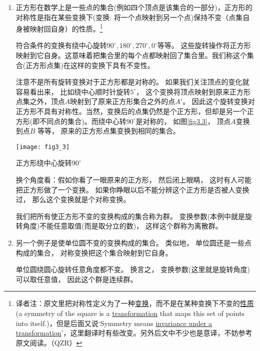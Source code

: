 \begin{enumerate}
	\item 正方形在数学上是一些点的集合(例如四个顶点是该集合的一部分)，正方形的对称性是指在某些变换下(变换: 将一个点映射到另一个点)保持不变（点集自身被映射回自身）的性质。\footnote{译者注：原文里把对称性定义为了一种\underline{变换}，而不是在某种变换下不变的\underline{性质}(a symmetry of the square is a \underline{transformation} that maps this set of points into itself.)，但是后面又说`Symmetry means \underline{invariance under a transformation}'，这里翻译时有些改变。另外后文中不少也是意译，不妨参考原文阅读。（QZR）}

	符合条件的变换有绕中心旋转$90^\circ, 180^\circ, 270^\circ, 0^\circ$等等。 这些旋转操作将正方形映射到它自身。这意味着把集合里的每个点都映射回了集合里。我们称这个集合(正方形点集)在这样的变换下具有不变性。



	注意不是所有旋转变换对于正方形都是对称的。 如果我们关注顶点的变化就容易看出来， 比如绕中心顺时针旋转$5^\circ$， 这个变换将顶点映射到原来正方形点集之外，顶点$A$映射到了原来正方形集合之外的点$A'$。 因此这个旋转变换对正方形不具有对称性。当然，变换后的点集仍然是个正方形，但却是另一个正方形(即不同点的集合)。而绕中心转$90^\circ$是对称的， 如图\ref{fig3.3}， 顶点$A$变换到点$B$ 等等， 原来的正方形点集变换到相同的集合。

	{
	\centering
	\captionsetup{type=figure}
	\texttt{[image: fig3\_3]}
	\caption{正方形绕中心旋转$90^\circ$}
	\label{fig3.3}
	}

	换个角度看：假如你看了一眼原来的正方形， 然后闭上眼睛， 这时有人可能把正方形做了一个变换。 如果你睁眼以后不能分辨这个正方形是否被人变换过， 那么这个变换就是个对称变换。

	我们把所有使正方形不变的变换构成的集合称为群。 变换参数(本例中就是旋转角度)不能任意取值(而是取分立的数)， 这样这个群称为离散群。

	\item 另一个例子是使单位圆不变的变换构成的集合。 类似地， 单位圆还是一些点构成的集合， 对称变换把这个集合映射到它自身。

	单位圆绕圆心旋转任意角度都不变。 换言之， 变换参数(这里就是旋转角度)可以取任意值， 因此这个群是连续群。
\end{enumerate}

